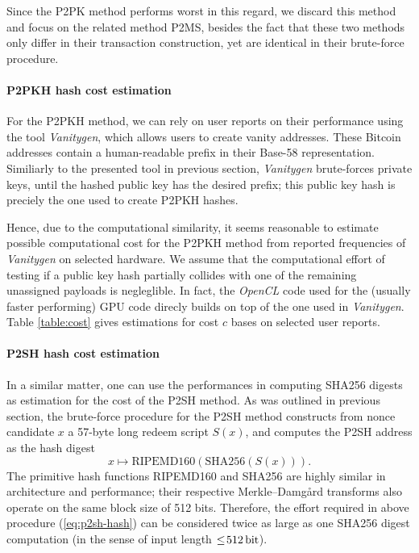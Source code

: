\documentclass[10pt,a4paper,twocolumn]{article}
\begin{document}
Since the P2PK method performs worst in this regard, we discard this method and focus on the related method P2MS, besides the fact that these two methods only differ in their transaction construction, yet are identical in their brute-force procedure.

\paragraph{P2PKH hash cost estimation}
For the {P2PKH} method, we can rely on user reports on their performance using the tool \emph{Vanitygen}, which allows users to create vanity addresses.
These Bitcoin addresses contain a human-readable prefix in their Base-58 representation.
Similiarly to the presented tool in previous section, \emph{Vanitygen} brute-forces private keys, until the hashed public key has the desired prefix;
this public key hash is preciely the one used to create {P2PKH} hashes.

Hence, due to the computational similarity, it seems reasonable to estimate possible computational cost for the {P2PKH} method from reported frequencies of \emph{Vanitygen} on selected hardware.
We assume that the computational effort of testing if a public key hash partially collides with one of the remaining unassigned payloads is negleglible.
In fact, the \emph{OpenCL} code used for the (usually faster performing) GPU code direcly builds on top of the one used in \emph{Vanitygen}.
Table \ref{table:cost} gives estimations for cost $c$ bases on selected user reports.

\paragraph{P2SH hash cost estimation}
In a similar matter, one can use the performances in computing {SHA256} digests as estimation for the cost of the {P2SH} method.
As was outlined in previous section, the brute-force procedure for the {P2SH} method constructs from nonce candidate $x$ a 57-byte long redeem script $S(x)$, and computes the {P2SH} address as the hash digest 
\begin{equation}
    x \mapsto \text{{RIPEMD160}}(\text{{SHA256}}(S(x))).\label{eq:p2sh-hash}
\end{equation}
The primitive hash functions {RIPEMD160} and {SHA256} are highly similar in architecture and performance; their respective Merkle–Damgård transforms also operate on the same block size of 512 bits.
Therefore, the effort required in above procedure (\ref{eq:p2sh-hash}) can be considered twice as large as one {SHA256} digest computation (in the sense of input length $\leq\!\SI{512}{\bit}$). 
\end{document}
